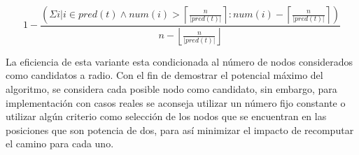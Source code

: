 \begin{small}
\begin{equation}
1-\dfrac{\left(\Sigma i |  i \in pred(t)
  						\wedge num(i) > 
  							\left\lceil \frac{n}{|pred(t)|} \right\rceil 
  					:  num(i) - 
  						\left\lceil \frac{n}{|pred(t)|} \right\rceil\right)}
  						{n-\left\lfloor \frac{n}{|pred(t)|} \right\rfloor}
\label{eq:distr}
\end{equation}
\end{small}

La eficiencia de esta variante esta condicionada al n\'umero de
nodos considerados como candidatos a radio. Con el fin de demostrar
el potencial m\'aximo del algoritmo, se considera cada posible nodo
como candidato, sin embargo, para implementaci\'on con casos reales 
se aconseja utilizar un n\'umero fijo constante o utilizar alg\'un
criterio como selecci\'on de los nodos que se encuentran en las
posiciones que son potencia de dos, para as\'i minimizar el impacto
de recomputar el camino para cada uno.
